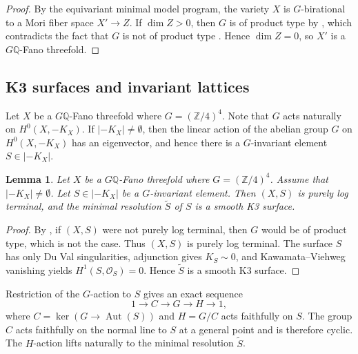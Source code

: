 \documentclass[10pt,oneside,reqno]{amsart}
\numberwithin{equation}{section}
\newtheorem{lemma}[theorem]{Lemma}
\theoremstyle{definition}
\newcommand{\Q}{\mathbb Q}
\newcommand{\Aut}{\operatorname{Aut}}
\begin{document}
\begin{proof}
By the equivariant minimal model program, the variety $X$ is $G$-birational
to a Mori fiber space $X'\to Z$.  If $\dim Z>0$, then $G$ is of product
type by \cite[Corollary 3.17]{LoginovProduct}, which contradicts the
fact that $G$ is not of product type
\cite[Table 1]{LoginovProduct}.  Hence
$\dim Z=0$, so $X'$ is a $G\Q$-Fano threefold.
\end{proof}

\subsection{K3 surfaces and invariant lattices}
\label{subsec-k3-surfaces}
Let $X$ be a $G\mathbb{Q}$-Fano threefold where $G=(\mathbb{Z}/4)^4$. 
Note that $G$ acts naturally on $H^0(X, -K_X)$. 
If $|-K_X|\neq\emptyset$, then the linear action of the abelian group
$G$ on $H^0(X,-K_X)$ has an eigenvector, and hence there is a
$G$-invariant element $S\in|-K_X|$.

\begin{lemma}
\label{lem-invariant-k3}
Let $X$ be a $G\mathbb{Q}$-Fano threefold where $G=(\mathbb{Z}/4)^4$.  Assume that $|-K_X|\neq \emptyset$. 
Let $S\in|-K_X|$ be a $G$-invariant element.  Then $(X,S)$ is purely log
terminal, and the minimal resolution $\widetilde S$ of $S$ is a smooth
K3 surface.
\end{lemma}

\begin{proof}
By \cite[Proof of Theorem~1.7]{LoginovProduct}, if $(X,S)$ were not
purely log terminal, then $G$ would be of product type, which is not the case.  Thus $(X,S)$ is
purely log terminal.  The surface $S$ has only Du Val singularities,
adjunction gives $K_S\sim0$, and Kawamata--Viehweg vanishing yields
$H^1(S,\mathcal O_S)=0$.  Hence $\widetilde S$ is a smooth K3 surface.
\end{proof}

Restriction of the $G$-action to $S$ gives an exact sequence
\begin{equation}
\label{eq-k3-exact-seq}
 1\longrightarrow C\longrightarrow G\longrightarrow H
 \longrightarrow1,
\end{equation}
where $C=\ker(G\to\Aut(S))$ and $H=G/C$ acts faithfully on $S$.
The group $C$ acts faithfully on the normal line to $S$ at a general
point and is therefore cyclic.  The $H$-action lifts naturally to the
minimal resolution $\widetilde S$.
\end{document}
